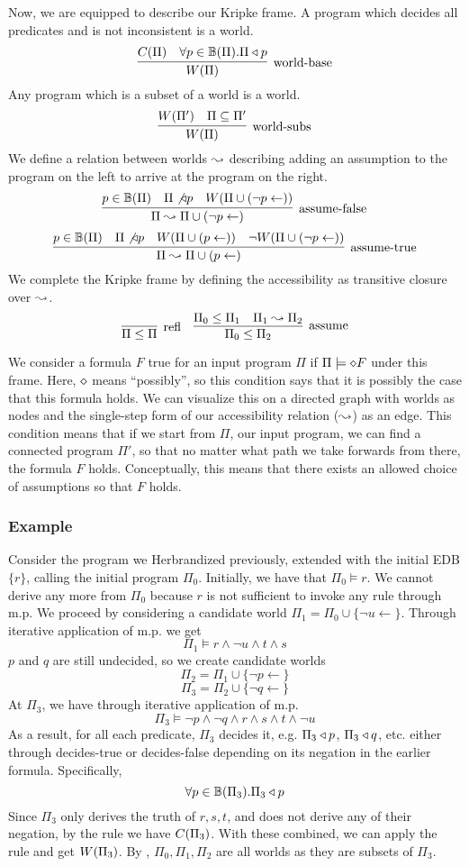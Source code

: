 Now, we are equipped to describe our Kripke frame.
A program which decides all predicates and is not inconsistent is a world.
\[
	\infer[\textrm{world-base}]{\world{\Pi}}{\cons{\Pi} & \forall p \in \hb(\Pi). \Pi \decides p}
\]
Any program which is a subset of a world is a world.
\[
	\infer[\textrm{world-subs}]{\world{\Pi}}{\world{\Pi'} & \Pi \subseteq \Pi'}
\]
We define a relation between worlds $\leadsto$ describing adding an assumption to the program on the left to arrive at the program on the right.
\[
	\infer[\textrm{assume-false}]{\Pi \stepass \Pi \cup (\neg p \leftarrow)}{p \in \hb(\Pi) & \Pi \not \decides p & \world{\Pi \cup (\neg p \leftarrow)}}
\]
\[
	\infer[\textrm{assume-true}]{\Pi \stepass \Pi \cup (p \leftarrow)}{p \in \hb(\Pi) & \Pi \not \decides p & \world{\Pi \cup (p \leftarrow)} & \neg \world{\Pi \cup (\neg p \leftarrow)}}
\]
We complete the Kripke frame by defining the accessibility as transitive closure over $\leadsto$.
\[
	\infer[\textrm{refl}]{\Pi \leq \Pi}{}
	\quad
	\infer[\textrm{assume}]{\Pi_0 \leq \Pi_2}{\Pi_0 \leq \Pi_1 & \Pi_1 \stepass \Pi_2}
\]

We consider a formula $F$ true for an input program $\Pi$ if $\Pi \models \diamond  F$ under this frame.
Here, $\diamond$ means ``possibly'', so this condition says that it is possibly the case that this formula holds.
We can visualize this on a directed graph with worlds as nodes and the single-step form of our accessibility relation ($\leadsto$) as an edge.
This condition means that if we start from $\Pi$, our input program, we can find a connected program $\Pi'$, so that no matter what path we take forwards from there, the formula $F$ holds.
Conceptually, this means that there exists an allowed choice of assumptions so that $F$ holds.

\subsubsection{Example}
Consider the program we Herbrandized previously, extended with the initial EDB $\{r\}$, calling the initial program $\Pi_0$.
Initially, we have that $\Pi_0 \models r$.
We cannot derive any more from $\Pi_0$ because $r$ is not sufficient to invoke any rule through m.p.
We proceed by considering a candidate world $\Pi_1 = \Pi_0 \cup \{\neg u \leftarrow\}$.
Through iterative application of m.p. we get
\[
\Pi_1 \models r \wedge \neg u \wedge t \wedge s
\]
$p$ and $q$ are still undecided, so we create candidate worlds
\[\Pi_2 = \Pi_1 \cup \{\neg p \leftarrow\}\]
\[\Pi_3 = \Pi_2 \cup \{\neg q \leftarrow\}\]
At $\Pi_3$, we have through iterative application of m.p.
\[
\Pi_3 \models \neg p \wedge \neg q \wedge r \wedge s \wedge t \wedge \neg u
\]
As a result, for all each predicate, $\Pi_3$ decides it, e.g. $\Pi_3 \triangleleft p$, $\Pi_3 \triangleleft q$, etc. either through decides-true or decides-false depending on its negation in the earlier formula.
Specifically,
\[
\forall p \in \mathbb{B}(\Pi_3). \Pi_3 \triangleleft p
\]
Since $\Pi_3$ only derives the truth of $r, s, t$, and does not derive any of their negation, by the  rule we have $C(\Pi_3)$.
With these combined, we can apply the  rule and get $W({\Pi_3})$.
By , $\Pi_0, \Pi_1, \Pi_2$ are all worlds as they are subsets of $\Pi_3$.

